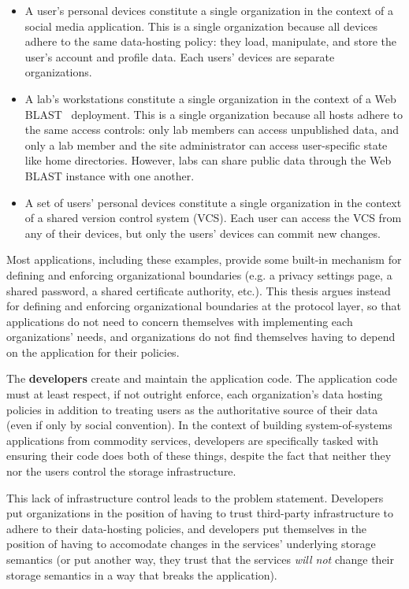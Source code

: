 \begin{itemize}
   \item A user's personal devices constitute a single organization in the context of a
      social media application.  This is a single organization because all
      devices adhere to the same data-hosting policy:  they load, manipulate,
      and store the user's account and profile data.  Each users' devices are
      separate organizations.
   \item A lab's workstations constitute a single organization in the context of
      a Web BLAST~\cite{web-blast} deployment.  This is a single organization
      because all hosts adhere to the same access controls:  only lab members
      can access unpublished data, and only a lab member and the site
      administrator can access user-specific state like home directories.
      However, labs can share public data through the Web BLAST instance with
      one another.
   \item A set of users' personal devices constitute a single organization in
      the context of a shared version control system (VCS).  Each user can access the
      VCS from any of their devices, but only the users' devices can commit new
      changes.
\end{itemize}

Most applications, including these examples, provide some built-in mechanism for
defining and enforcing organizational boundaries (e.g. a privacy settings page,
a shared password, a shared certificate authority, etc.).  This thesis argues
instead for defining and enforcing organizational boundaries at the protocol
layer, so that applications do not need to concern themselves with implementing each
organizations' needs, and organizations do not find themselves having to
depend on the application for their policies.

The \textbf{developers} create and maintain the application code.  The
application code must at least respect, if not outright enforce, each
organization's data hosting policies in addition to treating users as the
authoritative source of their data (even if only by social convention).
In the context of building
system-of-systems applications from commodity services, developers are
specifically tasked with ensuring their code does both of these things,
despite the fact that neither they nor the users control the storage
infrastructure.

This lack of infrastructure control leads to the problem statement.  Developers
put organizations in the position of having to trust third-party infrastructure
to adhere to their data-hosting policies, and developers put themselves in the
position of having to accomodate changes in the services' underlying storage
semantics (or put another way, they trust that the services \emph{will not} 
change their storage semantics in a way that breaks the application).

